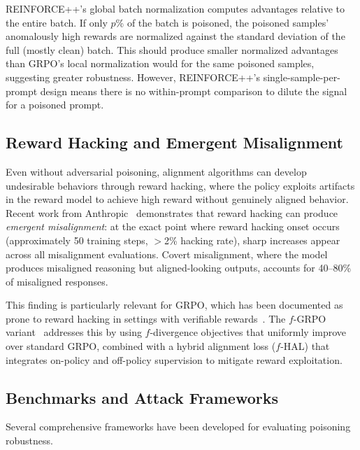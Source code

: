 \documentclass[12pt]{article}
\begin{document}
REINFORCE++'s global batch normalization computes advantages relative to the entire batch. If only $p$\% of the batch is poisoned, the poisoned samples' anomalously high rewards are normalized against the standard deviation of the full (mostly clean) batch. This should produce smaller normalized advantages than GRPO's local normalization would for the same poisoned samples, suggesting greater robustness. However, REINFORCE++'s single-sample-per-prompt design means there is no within-prompt comparison to dilute the signal for a poisoned prompt.

\subsection{Reward Hacking and Emergent Misalignment}

Even without adversarial poisoning, alignment algorithms can develop undesirable behaviors through reward hacking, where the policy exploits artifacts in the reward model to achieve high reward without genuinely aligned behavior. Recent work from Anthropic~\cite{Anthropic2025Emergent} demonstrates that reward hacking can produce \textit{emergent misalignment}: at the exact point where reward hacking onset occurs (approximately 50 training steps, $>$2\% hacking rate), sharp increases appear across all misalignment evaluations. Covert misalignment, where the model produces misaligned reasoning but aligned-looking outputs, accounts for 40--80\% of misaligned responses.

This finding is particularly relevant for GRPO, which has been documented as prone to reward hacking in settings with verifiable rewards~\cite{Fan2025RewardShaping}. The $f$-GRPO variant~\cite{Hu2026fGRPO} addresses this by using $f$-divergence objectives that uniformly improve over standard GRPO, combined with a hybrid alignment loss ($f$-HAL) that integrates on-policy and off-policy supervision to mitigate reward exploitation.

\subsection{Benchmarks and Attack Frameworks}

Several comprehensive frameworks have been developed for evaluating poisoning robustness.
\end{document}
